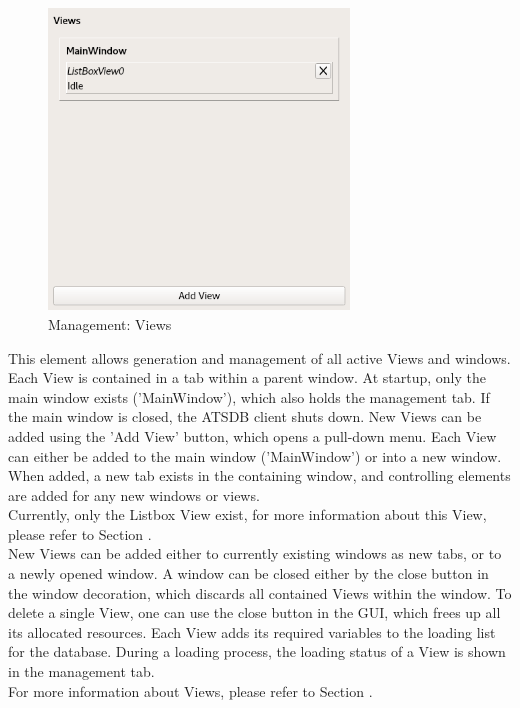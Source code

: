 \documentclass[10pt,letterpaper,extrafontsizes]{memoir}
\begin{document}
\begin{figure}[H]
  \center
    \includegraphics[width=8cm]{../screenshots/management_views.png}
  \caption{Management: Views}
  \label{fig:management_views}
\end{figure}

This element allows generation and management of all active Views and windows. Each View is contained
in a tab within a parent window.  At startup, only the main window exists ('MainWindow'), which also holds
the management tab. If the main window is closed, the ATSDB client shuts down. New Views can be added using the 'Add View' button, which opens a pull-down menu. Each View can either be added to the main window ('MainWindow') or into a new window. When added, a new tab exists in the containing window, and controlling elements are added for any new
windows or views. \\

Currently, only the Listbox View exist, for more information about this View, please refer to Section .\\

New Views can be added either to currently existing windows as new tabs, or to a newly opened window. A window can be closed either by the close button in the window decoration, which discards all contained Views within the window.  To delete a single View, one can use the close button in the GUI, which frees up all its allocated resources. Each View adds its required variables to the loading list for the database.  During a loading process, the loading status  of a View is shown in the management tab.\\

For more information about Views, please refer to Section .
\end{document}
